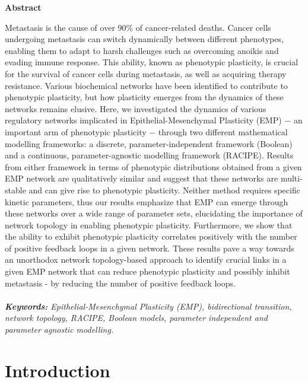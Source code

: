 \documentclass[preprint,review,12pt]{elsarticle}
\begin{document}
	\newpage
	\begin{center}
		\Large{\textbf{Abstract}}
	\end{center}
	Metastasis is the cause of over 90\% of cancer-related deaths. Cancer cells undergoing metastasis can switch dynamically between different phenotypes, enabling them to adapt to harsh challenges such as overcoming anoikis and evading immune response. This ability, known as phenotypic plasticity, is crucial for the survival of cancer cells during metastasis, as well as acquiring therapy resistance. Various biochemical networks have been identified to contribute to phenotypic plasticity, but how plasticity emerges from the dynamics of these networks remains elusive. Here, we investigated the dynamics of various regulatory networks implicated in Epithelial-Mesenchymal Plasticity (EMP) $-$ an important arm of phenotypic plasticity $-$ through two different mathematical modelling frameworks: a discrete, parameter-independent framework (Boolean) and a continuous, parameter-agnostic modelling framework (RACIPE). Results from either framework in terms of phenotypic distributions obtained from a given EMP network are qualitatively similar and suggest that these networks are multi-stable and can give rise to phenotypic plasticity. Neither method requires specific kinetic parameters, thus our results emphasize that EMP can emerge through these networks over a wide range of parameter sets, elucidating the importance of network topology in enabling phenotypic plasticity. Furthermore, we show that the ability to exhibit phenotypic plasticity correlates positively with the number of positive feedback loops in a given network. These results pave a way towards an unorthodox network topology-based approach to identify crucial links in a given EMP network that can reduce phenotypic plasticity and possibly inhibit metastasis - by reducing the number of positive feedback loops.
	\\
	\\
	\textit{\textbf{Keywords:} \small{Epithelial-Mesenchymal Plasticity (EMP), bidirectional transition, network topology, RACIPE, Boolean models, parameter independent and parameter agnostic model\color{red}ling.}}
	
	
	\newpage
	\linenumbers %
	
	\section{Introduction}
	\label{S:1}
	
\end{document}

